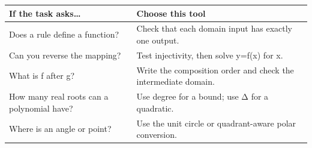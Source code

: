 \documentclass[11pt]{article}
\begin{document}
\begin{keepsection}
\begin{keepsection}
\begin{center}\small\begin{tabularx}{\linewidth}{>{\raggedright\arraybackslash}X>{\raggedright\arraybackslash}X}\toprule
\textbf{If the task asks…} & \textbf{Choose this tool} \\ \midrule
Does a rule define a function? & Check that each domain input has exactly one output. \\
Can you reverse the mapping? & Test injectivity, then solve y=f(x) for x. \\
What is f after g? & Write the composition order and check the intermediate domain. \\
How many real roots can a polynomial have? & Use degree for a bound; use Δ for a quadratic. \\
Where is an angle or point? & Use the unit circle or quadrant-aware polar conversion. \\
\bottomrule\end{tabularx}\end{center}
\end{keepsection}
\end{keepsection}
\end{document}
